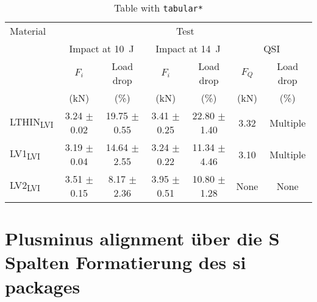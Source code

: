 \documentclass{article}
\begin{document}
\begin{table}
\bigskip\bigskip

\caption{Table with \texttt{tabular*}} \label{tab:tabular*}
\setlength\tabcolsep{0pt}
\begin{tabular*}{\textwidth}{@{\extracolsep{\fill}} l *{6}{c}}
\toprule
Material & \multicolumn{6}{c}{Test} \\ 
\cmidrule(l){2-7} 
& \multicolumn{2}{c}{Impact at \SI{10}{\joule}} 
& \multicolumn{2}{c}{Impact at \SI{14}{\joule}} 
& \multicolumn{2}{c}{QSI} \\ 
\cmidrule{2-3} \cmidrule{4-5} \cmidrule{6-7} 
& $F_i$ & Load drop & $F_i$ & Load drop & $F_Q$ & Load drop \\ 
& (\si{\kilo\newton}) & (\%) & (\si{\kilo\newton}) & (\%) & (\si{\kilo\newton}) & (\%) \\
\midrule
LTHIN\textsubscript{LVI}    & 3.24 $\pm$ 0.02       & 19.75 $\pm$ 0.55       & 3.41 $\pm$ 0.25       & 22.80 $\pm$ 1.40       & 3.32     & Multiple     \\
LV1\textsubscript{LVI}      & 3.19 $\pm$ 0.04       & 14.64 $\pm$ 2.55       & 3.24 $\pm$ 0.22       & 11.34 $\pm$ 4.46       & 3.10     & Multiple     \\
LV2\textsubscript{LVI}      & 3.51 $\pm$ 0.15       & 8.17 $\pm$ 2.36        & 3.95 $\pm$ 0.51       & 10.80 $\pm$ 1.28       & None     & None  \\ 
\bottomrule
\end{tabular*}
\end{table}


\section{Plusminus alignment über die S Spalten Formatierung des si packages}
\end{document}
